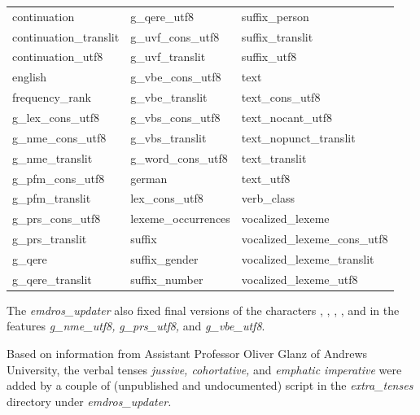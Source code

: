 \documentclass[11pt,oneside,a4paper]{memoir}
\newcommand{\heb}[1]{{\RL {\ezr #1}}}
\begin{document}
\begin{center}
  \begin{tabular}{lll}
    continuation           & g\_qere\_utf8       &  suffix\_person                \\
    continuation\_translit & g\_uvf\_cons\_utf8  &  suffix\_translit              \\
    continuation\_utf8     & g\_uvf\_translit    &  suffix\_utf8                  \\
    english                & g\_vbe\_cons\_utf8  &  text                          \\
    frequency\_rank        & g\_vbe\_translit    &  text\_cons\_utf8              \\
    g\_lex\_cons\_utf8     & g\_vbs\_cons\_utf8  &  text\_nocant\_utf8            \\
    g\_nme\_cons\_utf8     & g\_vbs\_translit    &  text\_nopunct\_translit       \\
    g\_nme\_translit       & g\_word\_cons\_utf8 &  text\_translit                \\
    g\_pfm\_cons\_utf8     & german              &  text\_utf8                    \\
    g\_pfm\_translit       & lex\_cons\_utf8     &  verb\_class                   \\
    g\_prs\_cons\_utf8     & lexeme\_occurrences &  vocalized\_lexeme             \\
    g\_prs\_translit       & suffix              &  vocalized\_lexeme\_cons\_utf8 \\
    g\_qere                & suffix\_gender      &  vocalized\_lexeme\_translit   \\
    g\_qere\_translit      & suffix\_number      &  vocalized\_lexeme\_utf8       \\
  \end{tabular}
\end{center}

The \emph{emdros\_updater} also fixed final versions of the characters \heb{ך}, \heb{ם}, \heb{ן},
\heb{ף}, and \heb{ץ} in the features \emph{g\_nme\_utf8,} \emph{g\_prs\_utf8,} and
\emph{g\_vbe\_utf8}.


Based on information from Assistant Professor Oliver Glanz of Andrews University, the verbal tenses
\emph{jussive, cohortative,} and \emph{emphatic imperative} were added by a couple of (unpublished
and undocumented) script in the \emph{extra\_tenses} directory under \emph{emdros\_updater.}

\end{document}
